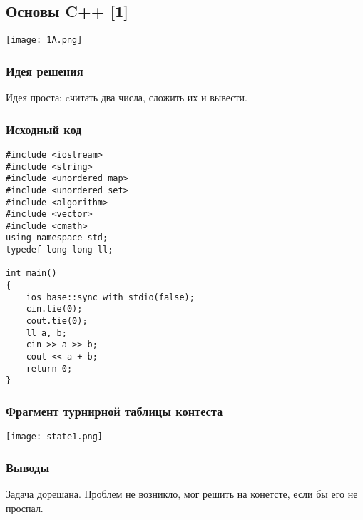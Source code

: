\subsection*{Основы C++ [1]}
\begin{center}
\texttt{[image: 1A.png]}
\end{center}
\subsubsection*{Идея решения}
Идея проста: cчитать два числа, сложить их и вывести.

\subsubsection*{Исходный код}
\begin{lstlisting}
#include <iostream>
#include <string>
#include <unordered_map>
#include <unordered_set>
#include <algorithm>
#include <vector>
#include <cmath>
using namespace std;
typedef long long ll;

int main()
{
	ios_base::sync_with_stdio(false);
	cin.tie(0);
	cout.tie(0);
	ll a, b;
	cin >> a >> b;
	cout << a + b;
	return 0;
}
\end{lstlisting}
\subsubsection*{Фрагмент турнирной таблицы контеста}
\begin{center}
\texttt{[image: state1.png]}\newline\noindent
\end{center}

\subsubsection*{Выводы}
Задача дорешана. Проблем не возникло, мог решить на конетсте, если бы его не проспал.
